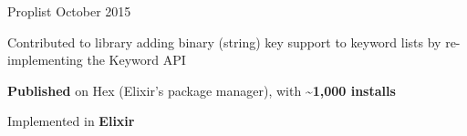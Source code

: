 \begin{cventries}
    \cventry
    {Proplist} %
    {} %
    {}{October 2015}{
        \begin{cvitems} %
            \item {Contributed to library adding binary (string) key support to keyword lists by re-implementing the Keyword API}
            \item {\textbf{Published} on Hex (Elixir's package manager), with \textbf{\textasciitilde1,000 installs}}
            \item {Implemented in \textbf{Elixir}}
        \end{cvitems}
    }

\end{cventries}
